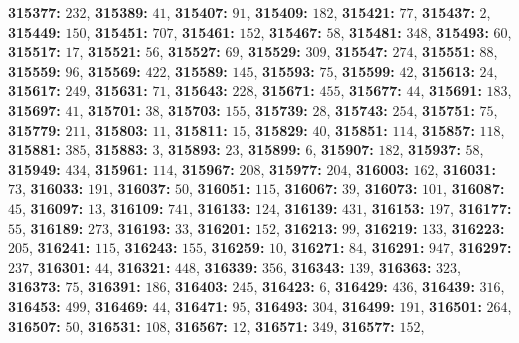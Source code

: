 \textsf{\bfseries 315377:} $232$, \textsf{\bfseries 315389:} $41$, \textsf{\bfseries 315407:} $91$, \textsf{\bfseries 315409:} $182$, \textsf{\bfseries 315421:} $77$, \textsf{\bfseries 315437:} $2$, \textsf{\bfseries 315449:} $150$, \textsf{\bfseries 315451:} $707$, \textsf{\bfseries 315461:} $152$, \textsf{\bfseries 315467:} $58$, \textsf{\bfseries 315481:} $348$, \textsf{\bfseries 315493:} $60$, \textsf{\bfseries 315517:} $17$, \textsf{\bfseries 315521:} $56$, \textsf{\bfseries 315527:} $69$, \textsf{\bfseries 315529:} $309$, \textsf{\bfseries 315547:} $274$, \textsf{\bfseries 315551:} $88$, \textsf{\bfseries 315559:} $96$, \textsf{\bfseries 315569:} $422$, \textsf{\bfseries 315589:} $145$, \textsf{\bfseries 315593:} $75$, \textsf{\bfseries 315599:} $42$, \textsf{\bfseries 315613:} $24$, \textsf{\bfseries 315617:} $249$, \textsf{\bfseries 315631:} $71$, \textsf{\bfseries 315643:} $228$, \textsf{\bfseries 315671:} $455$, \textsf{\bfseries 315677:} $44$, \textsf{\bfseries 315691:} $183$, \textsf{\bfseries 315697:} $41$, \textsf{\bfseries 315701:} $38$, \textsf{\bfseries 315703:} $155$, \textsf{\bfseries 315739:} $28$, \textsf{\bfseries 315743:} $254$, \textsf{\bfseries 315751:} $75$, \textsf{\bfseries 315779:} $211$, \textsf{\bfseries 315803:} $11$, \textsf{\bfseries 315811:} $15$, \textsf{\bfseries 315829:} $40$, \textsf{\bfseries 315851:} $114$, \textsf{\bfseries 315857:} $118$, \textsf{\bfseries 315881:} $385$, \textsf{\bfseries 315883:} $3$, \textsf{\bfseries 315893:} $23$, \textsf{\bfseries 315899:} $6$, \textsf{\bfseries 315907:} $182$, \textsf{\bfseries 315937:} $58$, \textsf{\bfseries 315949:} $434$, \textsf{\bfseries 315961:} $114$, \textsf{\bfseries 315967:} $208$, \textsf{\bfseries 315977:} $204$, \textsf{\bfseries 316003:} $162$, \textsf{\bfseries 316031:} $73$, \textsf{\bfseries 316033:} $191$, \textsf{\bfseries 316037:} $50$, \textsf{\bfseries 316051:} $115$, \textsf{\bfseries 316067:} $39$, \textsf{\bfseries 316073:} $101$, \textsf{\bfseries 316087:} $45$, \textsf{\bfseries 316097:} $13$, \textsf{\bfseries 316109:} $741$, \textsf{\bfseries 316133:} $124$, \textsf{\bfseries 316139:} $431$, \textsf{\bfseries 316153:} $197$, \textsf{\bfseries 316177:} $55$, \textsf{\bfseries 316189:} $273$, \textsf{\bfseries 316193:} $33$, \textsf{\bfseries 316201:} $152$, \textsf{\bfseries 316213:} $99$, \textsf{\bfseries 316219:} $133$, \textsf{\bfseries 316223:} $205$, \textsf{\bfseries 316241:} $115$, \textsf{\bfseries 316243:} $155$, \textsf{\bfseries 316259:} $10$, \textsf{\bfseries 316271:} $84$, \textsf{\bfseries 316291:} $947$, \textsf{\bfseries 316297:} $237$, \textsf{\bfseries 316301:} $44$, \textsf{\bfseries 316321:} $448$, \textsf{\bfseries 316339:} $356$, \textsf{\bfseries 316343:} $139$, \textsf{\bfseries 316363:} $323$, \textsf{\bfseries 316373:} $75$, \textsf{\bfseries 316391:} $186$, \textsf{\bfseries 316403:} $245$, \textsf{\bfseries 316423:} $6$, \textsf{\bfseries 316429:} $436$, \textsf{\bfseries 316439:} $316$, \textsf{\bfseries 316453:} $499$, \textsf{\bfseries 316469:} $44$, \textsf{\bfseries 316471:} $95$, \textsf{\bfseries 316493:} $304$, \textsf{\bfseries 316499:} $191$, \textsf{\bfseries 316501:} $264$, \textsf{\bfseries 316507:} $50$, \textsf{\bfseries 316531:} $108$, \textsf{\bfseries 316567:} $12$, \textsf{\bfseries 316571:} $349$, \textsf{\bfseries 316577:} $152$, 
